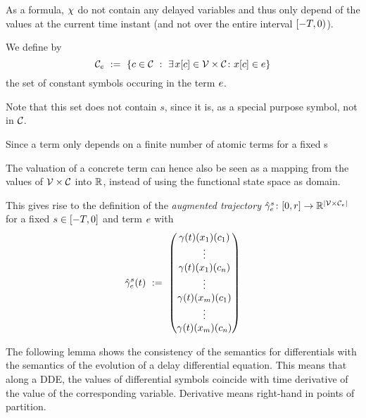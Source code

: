     As a \FOLR formula, $\ivr$ do not contain any delayed variables and thus only depend of the values at the current time instant (and not over the entire interval $\delayinterval$).

    \begin{definition}\label{def:termvars}
        We define by
        \begin{equation*}
            \constants[\astrm] \defeq \set{c\in\constants \with \mexists{\x[c]\in\delayvars}\holds\x[c]\in\astrm}
        \end{equation*}
        the set of constant symbols occuring in the term $\astrm$.

        Note that this set does not contain $s$, since it is, as a special purpose symbol, not in $\constants$.
    \end{definition}

    \begin{definition}\label{def:aug-trajectory}
        Since a term only depends on a finite number of atomic terms for a fixed s
        
        The valuation of a concrete term can hence also be seen as a mapping from the values of $\delayvars$
        into $\R$, instead of using the functional state space as domain.

        This gives rise to the definition of the \emph{augmented trajectory} $\augtrajectory[s]{\astrm}\from\compactum{0}{r}\to\R^{\abs{\delayvars[\astrm]}}$ for a fixed $s\in\closeddelayinterval$ and term $\astrm$ with
        \begin{equation*}
            \augtrajectory[s]{\astrm}(t) \defeq \colvec{\trajectory(t)(x_1)(c_1)\\ \vdots\\ \trajectory(t)(x_1)(c_n)\\ \vdots\\ \trajectory(t)(x_m)(c_1)\\ \vdots\\ \trajectory(t)(x_m)(c_n)}
        \end{equation*}
    \end{definition}

    The following lemma shows the consistency of the semantics for differentials with the semantics of the evolution of a delay differential equation.
    This means that along a DDE, the values of differential symbols coincide with time derivative of the value of the corresponding variable.
    Derivative means right-hand in points of partition.

